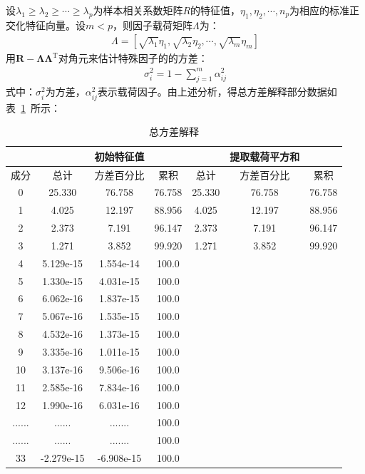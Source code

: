 \documentclass{whutmod}
\begin{document}
	设$\lambda_{1} \geqslant \lambda_{2} \geqslant \cdots \geqslant \lambda_{p}$为样本相关系数矩阵$R$的特征值，$\eta _ { 1 } , \eta _ { 2 } , \cdots , n _ { p }$为相应的标准正交化特征向量。设$m<p$，则因子载荷矩阵$\Lambda$为：
	\begin{gather}
	\Lambda=\left[\sqrt{\lambda_{1}} \eta_{1}, \sqrt{\lambda_{2}} \eta_{2}, \cdots, \sqrt{\lambda_{m}} \eta_{m}\right]
	\end{gather}
    用$\boldsymbol{R}-\boldsymbol{\Lambda} \boldsymbol{\Lambda}^{\mathrm{T}}$对角元来估计特殊因子的的方差：
	\begin{gather}
	\sigma_{i}^{2}=1-\sum_{j=1}^{m} \alpha_{i j}^{2}
	\end{gather}
	式中：$\sigma_{i}^{2}$为方差，$\alpha_{i j}^{2}$表示载荷因子。由上述分析，得总方差解释部分数据如表~\ref{biaosan}~所示：	
		\begin{table}[H]
		\centering
		\caption{总方差解释}\label{biaosan}
		\begin{tabular}{ccccccc}
			\toprule[1.5pt]
		\multicolumn{1}{m{1cm}}{\centering } &
				\multicolumn{1}{m{1.5cm}}{\centering  } &
		 \multicolumn{1}{m{3cm}}{\centering 初始特征值} &
		 		\multicolumn{1}{m{1cm}}{\centering  } &
		\multicolumn{1}{m{1cm}}{\centering  } &
		 \multicolumn{1}{m{3cm}}{\centering 提取载荷平方和}&
		 		\multicolumn{1}{m{1.5cm}}{\centering  } \\\hline
		\multicolumn{1}{m{1cm}}{\centering  成分} &
		\multicolumn{1}{m{1.5cm}}{\centering  总计} &
		\multicolumn{1}{m{2cm}}{\centering  方差百分比} &
		\multicolumn{1}{m{1cm}}{\centering  累积} &
		\multicolumn{1}{m{1cm}}{\centering  总计} &
		\multicolumn{1}{m{3cm}}{\centering  方差百分比} &				\multicolumn{1}{m{1.5cm}}{\centering  累积} \\

			\midrule[1pt]
			0&25.330&76.758&76.758&25.330&76.758&76.758 \\
			1&4.025&12.197&88.956&4.025&12.197&88.956 \\
			2&2.373&7.191&96.147&2.373&7.191&96.147 \\
			3&1.271&3.852&99.920&1.271&3.852&99.920 \\
			4&5.129e-15&1.554e-14&100.0&&& \\
			5&1.330e-15&4.031e-15&100.0&&& \\
			6&6.062e-16&1.837e-15&100.0&&& \\
			7&5.067e-16&1.535e-15&100.0&&& \\
			8&4.532e-16&1.373e-15&100.0&&& \\
			9&3.335e-16&1.011e-15&100.0&&& \\
			10&3.137e-16&9.506e-16&100.0&&& \\
			11&2.585e-16&7.834e-16&100.0&&& \\
			12&1.990e-16&6.031e-16&100.0&&& \\
			......&......&.......&100.0&&& \\
			......&......&.......&100.0&&& \\
			33&-2.279e-15&-6.908e-15&100.0&&& \\
			\bottomrule[1.5pt]
		\end{tabular}
	\end{table}
	
\end{document}
